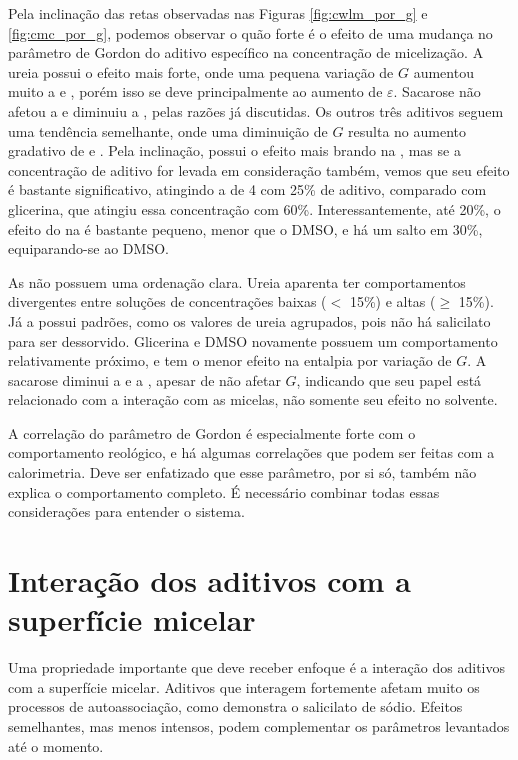 		Pela inclinação das retas observadas nas Figuras \ref{fig:cwlm_por_g} e \ref{fig:cmc_por_g}, podemos observar o quão forte é o efeito de uma mudança no parâmetro de Gordon do aditivo específico na concentração de micelização. A ureia possui o efeito mais forte, onde uma pequena variação de \(G\) aumentou muito a \cmc e \cwlm, porém isso se deve principalmente ao aumento de \(\varepsilon\). Sacarose não afetou a \cwlm{} e diminuiu a \cmc, pelas razões já discutidas. Os outros três aditivos seguem uma tendência semelhante, onde uma diminuição de \(G\) resulta no aumento gradativo de \cwlm{} e \cmc. Pela inclinação, \BD{} possui o efeito mais brando na \cwlm, mas se a concentração de aditivo for levada em consideração também, vemos que seu efeito é bastante significativo, atingindo a \cwlm{} de 4 \mM{} com 25\% de aditivo, comparado com glicerina, que atingiu essa concentração com 60\%. Interessantemente, até 20\%, o efeito do \BD{} na \cmc{} é bastante pequeno, menor que o DMSO, e há um salto em 30\%, equiparando-se ao DMSO.
				
		As \DHwlm{} não possuem uma ordenação clara. Ureia aparenta ter comportamentos divergentes entre soluções de concentrações baixas (\(<\) 15\%) e altas (\(\ge\) 15\%). Já a \DHmic{} possui padrões, como os valores de ureia agrupados, pois não há salicilato para ser dessorvido. Glicerina e DMSO novamente possuem um comportamento relativamente próximo, e \BD{} tem o menor efeito na entalpia por variação de \(G\). A sacarose diminui a \DHmic{} e a \cmc{}, apesar de não afetar \(G\), indicando que seu papel está relacionado com a interação com as micelas, não somente seu efeito no solvente.
		
		A correlação do parâmetro de Gordon é especialmente forte com o comportamento reológico, e há algumas correlações que podem ser feitas com a calorimetria. Deve ser enfatizado que esse parâmetro, por si só, também não explica o comportamento completo. É necessário combinar todas essas considerações para entender o sistema.
		\FloatBarrier
		
		\section{Interação dos aditivos com a superfície micelar}
		
		Uma propriedade importante que deve receber enfoque é a interação dos aditivos com a superfície micelar. Aditivos que interagem fortemente afetam muito os processos de autoassociação, como demonstra o salicilato de sódio. Efeitos semelhantes, mas menos intensos, podem complementar os parâmetros levantados até o momento.
		
